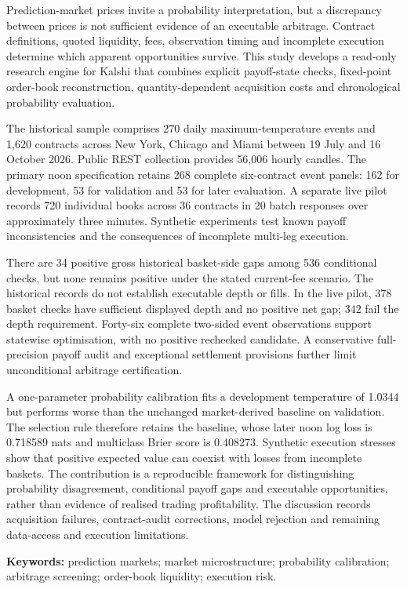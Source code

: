 Prediction-market prices invite a probability interpretation, but a discrepancy between prices is not sufficient evidence of an executable arbitrage. Contract definitions, quoted liquidity, fees, observation timing and incomplete execution determine which apparent opportunities survive. This study develops a read-only research engine for Kalshi that combines explicit payoff-state checks, fixed-point order-book reconstruction, quantity-dependent acquisition costs and chronological probability evaluation.

The historical sample comprises 270 daily maximum-temperature events and 1,620 contracts across New York, Chicago and Miami between 19 July and 16 October 2026. Public REST collection provides 56,006 hourly candles. The primary noon specification retains 268 complete six-contract event panels: 162 for development, 53 for validation and 53 for later evaluation. A separate live pilot records 720 individual books across 36 contracts in 20 batch responses over approximately three minutes. Synthetic experiments test known payoff inconsistencies and the consequences of incomplete multi-leg execution.

There are 34 positive gross historical basket-side gaps among 536 conditional checks, but none remains positive under the stated current-fee scenario. The historical records do not establish executable depth or fills. In the live pilot, 378 basket checks have sufficient displayed depth and no positive net gap; 342 fail the depth requirement. Forty-six complete two-sided event observations support statewise optimisation, with no positive rechecked candidate. A conservative full-precision payoff audit and exceptional settlement provisions further limit unconditional arbitrage certification.

A one-parameter probability calibration fits a development temperature of 1.0344 but performs worse than the unchanged market-derived baseline on validation. The selection rule therefore retains the baseline, whose later noon log loss is 0.718589 nats and multiclass Brier score is 0.408273. Synthetic execution stresses show that positive expected value can coexist with losses from incomplete baskets. The contribution is a reproducible framework for distinguishing probability disagreement, conditional payoff gaps and executable opportunities, rather than evidence of realised trading profitability. The discussion records acquisition failures, contract-audit corrections, model rejection and remaining data-access and execution limitations.

\vspace{4pt}
\textbf{Keywords:} prediction markets; market microstructure; probability calibration; arbitrage screening; order-book liquidity; execution risk.
